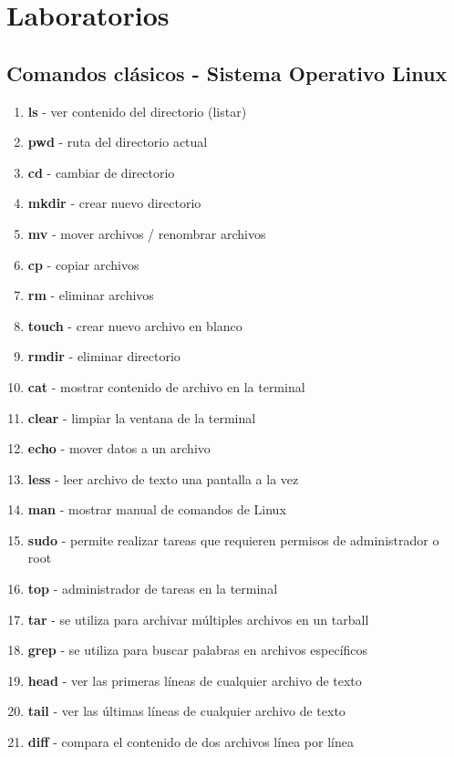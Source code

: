 
\section{Laboratorios}
\subsection{Comandos clásicos - Sistema Operativo Linux}


\begin{enumerate}
\item \textbf{ls} - ver contenido del directorio (listar)
\item \textbf{pwd} - ruta del directorio actual
\item \textbf{cd} - cambiar de directorio
\item \textbf{mkdir} - crear nuevo directorio
\item \textbf{mv} - mover archivos / renombrar archivos
\item \textbf{cp} - copiar archivos
\item \textbf{rm} - eliminar archivos
\item \textbf{touch} - crear nuevo archivo en blanco
\item \textbf{rmdir} - eliminar directorio
\item \textbf{cat} - mostrar contenido de archivo en la terminal
\item \textbf{clear} - limpiar la ventana de la terminal
\item \textbf{echo} - mover datos a un archivo
\item \textbf{less} - leer archivo de texto una pantalla a la vez
\item \textbf{man} - mostrar manual de comandos de Linux
\item \textbf{sudo} - permite realizar tareas que requieren permisos de administrador o root
\item \textbf{top} - administrador de tareas en la terminal
\item \textbf{tar} - se utiliza para archivar múltiples archivos en un tarball
\item \textbf{grep} - se utiliza para buscar palabras en archivos específicos
\item \textbf{head} - ver las primeras líneas de cualquier archivo de texto
\item \textbf{tail} - ver las últimas líneas de cualquier archivo de texto
\item \textbf{diff} - compara el contenido de dos archivos línea por línea

\end{enumerate}
